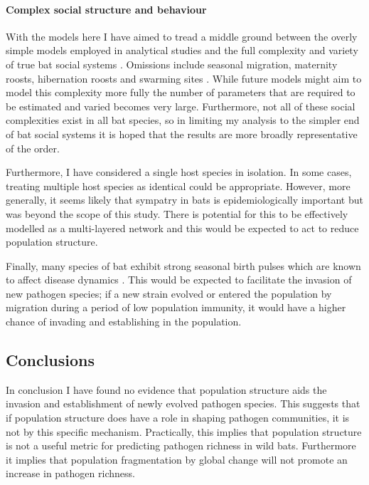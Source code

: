 \paragraph{Complex social structure and behaviour}

With the models here I have aimed to tread a middle ground between the overly simple models employed in analytical studies \cite{allen2004sis} and the full complexity and variety of true bat social systems \cite{kerth2008causes}.
Omissions include seasonal migration,  maternity roosts, hibernation roosts and swarming sites \cite{kerth2008causes, fleming2003ecology, richter2008first, cryan2014continental}. 
While future models might aim to model this complexity more fully the number of parameters that are required to be estimated and varied becomes very large.
Furthermore, not all of these social complexities exist in all bat species, so in limiting my analysis to the simpler end of bat social systems it is hoped that the results are more broadly representative of the order.

Furthermore, I have considered a single host species in isolation.
In some cases, treating multiple host species as identical could be appropriate.
However, more generally, it seems likely that sympatry in bats is epidemiologically important \cite{brierley2016quantifying, luis2013comparison} but was beyond the scope of this study.
There is potential for this to be effectively modelled as a multi-layered network \cite{wang2016structural, funk2010interacting} and this would be expected to act to reduce population structure.

Finally, many species of bat exhibit strong seasonal birth pulses which are known to affect disease dynamics \cite{hayman2015biannual,peel2014effect,amman2012seasonal}.
This would be expected to facilitate the invasion of new pathogen species; if a new strain evolved or entered the population by migration during a period of low population immunity, it would have a higher chance of invading and establishing in the population.

\subsection{Conclusions}

In conclusion I have found no evidence that population structure aids the invasion and establishment of newly evolved pathogen species.
This suggests that if population structure does have a role in shaping pathogen communities, it is not by this specific mechanism.
Practically, this implies that population structure is not a useful metric for predicting pathogen richness in wild bats.
Furthermore it implies that population fragmentation by global change will not promote an increase in pathogen richness.





